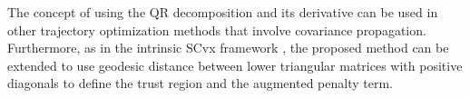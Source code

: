 \documentclass{IEEEtran}
\begin{document}
The concept of using the QR decomposition and its derivative can be used in other trajectory optimization methods that involve covariance propagation. Furthermore, as in the intrinsic SCvx framework \cite{kraislerIntrinsicSuccessiveConvexification2025a}, the proposed method can be extended to use geodesic distance between lower triangular matrices with positive diagonals \cite{linRiemannianGeometrySymmetric2019} to define the trust region and the augmented penalty term.




\end{document}

